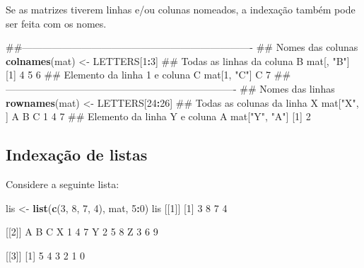 \documentclass[10pt,a4paper]{book}
\newenvironment{Shaded}{\begin{snugshade}}{\end{snugshade}}
\newcommand{\KeywordTok}[1]{\textcolor[rgb]{0.13,0.29,0.53}{\textbf{#1}}}
\newcommand{\DecValTok}[1]{\textcolor[rgb]{0.00,0.00,0.81}{#1}}
\newcommand{\StringTok}[1]{\textcolor[rgb]{0.31,0.60,0.02}{#1}}
\newcommand{\OperatorTok}[1]{\textcolor[rgb]{0.81,0.36,0.00}{\textbf{#1}}}
\newcommand{\NormalTok}[1]{#1}
\begin{document}
Se as matrizes tiverem linhas e/ou colunas nomeados, a indexação também
pode ser feita com os nomes.

\begin{Shaded}
\begin{Highlighting}[]
\NormalTok{##----------------------------------------------------------------------}
\NormalTok{## Nomes das colunas}
\KeywordTok{colnames}\NormalTok{(mat) <-}\StringTok{ }\NormalTok{LETTERS[}\DecValTok{1}\OperatorTok{:}\DecValTok{3}\NormalTok{]}
\NormalTok{## Todas as linhas da coluna B}
\NormalTok{mat[, }\StringTok{"B"}\NormalTok{]}
\NormalTok{[}\DecValTok{1}\NormalTok{] }\DecValTok{4} \DecValTok{5} \DecValTok{6}
\NormalTok{## Elemento da linha 1 e coluna C}
\NormalTok{mat[}\DecValTok{1}\NormalTok{, }\StringTok{"C"}\NormalTok{]}
\NormalTok{C }
\DecValTok{7} 
\NormalTok{##----------------------------------------------------------------------}
\NormalTok{## Nomes das linhas}
\KeywordTok{rownames}\NormalTok{(mat) <-}\StringTok{ }\NormalTok{LETTERS[}\DecValTok{24}\OperatorTok{:}\DecValTok{26}\NormalTok{]}
\NormalTok{## Todas as colunas da linha X}
\NormalTok{mat[}\StringTok{"X"}\NormalTok{, ]}
\NormalTok{A B C }
\DecValTok{1} \DecValTok{4} \DecValTok{7} 
\NormalTok{## Elemento da linha Y e coluna A}
\NormalTok{mat[}\StringTok{"Y"}\NormalTok{, }\StringTok{"A"}\NormalTok{]}
\NormalTok{[}\DecValTok{1}\NormalTok{] }\DecValTok{2}
\end{Highlighting}
\end{Shaded}

\subsection{Indexação de listas}\label{indexacao-de-listas}

Considere a seguinte lista:

\begin{Shaded}
\begin{Highlighting}[]
\NormalTok{lis <-}\StringTok{ }\KeywordTok{list}\NormalTok{(}\KeywordTok{c}\NormalTok{(}\DecValTok{3}\NormalTok{, }\DecValTok{8}\NormalTok{, }\DecValTok{7}\NormalTok{, }\DecValTok{4}\NormalTok{), mat, }\DecValTok{5}\OperatorTok{:}\DecValTok{0}\NormalTok{)}
\NormalTok{lis}
\NormalTok{[[}\DecValTok{1}\NormalTok{]]}
\NormalTok{[}\DecValTok{1}\NormalTok{] }\DecValTok{3} \DecValTok{8} \DecValTok{7} \DecValTok{4}

\NormalTok{[[}\DecValTok{2}\NormalTok{]]}
\NormalTok{  A B C}
\NormalTok{X }\DecValTok{1} \DecValTok{4} \DecValTok{7}
\NormalTok{Y }\DecValTok{2} \DecValTok{5} \DecValTok{8}
\NormalTok{Z }\DecValTok{3} \DecValTok{6} \DecValTok{9}

\NormalTok{[[}\DecValTok{3}\NormalTok{]]}
\NormalTok{[}\DecValTok{1}\NormalTok{] }\DecValTok{5} \DecValTok{4} \DecValTok{3} \DecValTok{2} \DecValTok{1} \DecValTok{0}
\end{Highlighting}
\end{Shaded}
\end{document}
